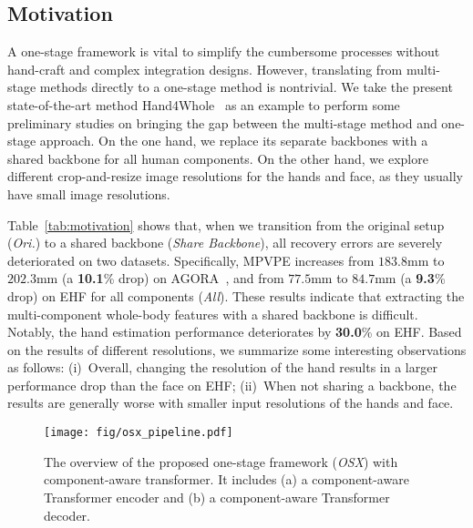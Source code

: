\documentclass[10pt,twocolumn,letterpaper]{article}
\newcommand{\modelname}{\emph{OSX}\xspace}
\begin{document}
\subsection{Motivation}
\label{sec:motivate}

A one-stage framework is vital to simplify the cumbersome processes without hand-craft and complex integration designs. 
However, translating from multi-stage methods directly to a one-stage method is nontrivial.
We take the present state-of-the-art method Hand4Whole~\cite{GyeongsikMoon2020hand4whole} as an example to perform some preliminary studies on bringing the gap between the multi-stage method and one-stage approach. 
On the one hand, we replace its separate backbones with a shared backbone for all human components. On the other hand, we explore different crop-and-resize image resolutions for the hands and face, as they usually have small image resolutions.


Table~\ref{tab:motivation} shows that, when we transition from the original setup (\emph{Ori.}) to a shared backbone (\emph{Share Backbone}), all recovery errors are severely deteriorated on two datasets. Specifically, MPVPE increases from $183.8$mm to $202.3$mm (a \textbf{10.1}\% drop) on AGORA~\cite{Patel_2021agora}, and from $77.5$mm to $84.7$mm (a \textbf{9.3}\% drop) on EHF for all components (\emph{All}). 
These results indicate that extracting the multi-component whole-body features with a shared backbone is difficult. Notably, the hand estimation performance deteriorates by
\textbf{30.0}\% on EHF.
Based on the results of different resolutions, we summarize some interesting observations as follows: 
(i)~Overall, changing the resolution of the hand results in a larger performance drop than the face on EHF;
(ii)~When not sharing a backbone, the results are generally worse with smaller input resolutions of the hands and face.



\begin{figure*}[t]
\begin{center}
\texttt{[image: fig/osx\_pipeline.pdf]}
\end{center}
\vspace{-0.4cm}
\caption{
The overview of the proposed one-stage framework (\modelname) with component-aware transformer. It includes (a) a component-aware Transformer encoder and (b) a component-aware Transformer decoder.
}
\label{fig:method}
\vspace{-0.4cm}
\end{figure*}
\end{document}
